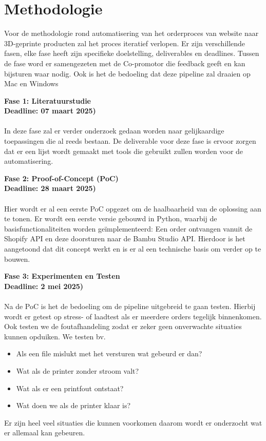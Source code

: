 
\section{Methodologie}%
\label{sec:methodologie}

Voor de methodologie rond automatisering van het orderproces van website naar 3D-geprinte producten zal het proces iteratief verlopen. Er zijn verschillende fasen, elke fase heeft zijn specifieke doelstelling, deliverables en deadlines. Tussen de fase word er samengezeten met de Co-promotor die feedback geeft en kan bijsturen waar nodig. Ook is het de bedoeling dat deze pipeline zal draaien op Mac en Windows 
\vspace{2em}

\textbf{Fase 1: Literatuurstudie}\\
\textbf{Deadline: 07 maart 2025)}\\\\
In deze fase zal er verder onderzoek gedaan worden naar gelijkaardige toepassingen die al reeds bestaan. De deliverable voor deze fase is ervoor zorgen dat er een lijst wordt gemaakt met tools die gebruikt zullen worden voor de automatisering.
\vspace{2em}

\textbf{Fase 2: Proof-of-Concept (PoC)}\\
\textbf{Deadline: 28 maart 2025)}\\\\
Hier wordt er al een eerste PoC opgezet om de haalbaarheid van de oplossing aan te tonen. Er wordt een eerste versie gebouwd in Python, waarbij de basisfunctionaliteiten worden geïmplementeerd: Een order ontvangen vanuit de Shopify API en deze doorsturen naar de Bambu Studio API. Hierdoor is het aangetoond dat dit concept werkt en is er al een technische basis om verder op te bouwen.
\vspace{1em}

\textbf{Fase 3: Experimenten en Testen}\\
\textbf{Deadline: 2 mei 2025)}\\\\
Na de PoC is het de bedoeling om de pipeline uitgebreid te gaan testen. Hierbij wordt er getest op stress- of laadtest als er meerdere orders tegelijk binnenkomen. Ook testen we de foutafhandeling zodat er zeker geen onverwachte situaties kunnen opduiken. We testen bv.
\begin{itemize}
 \item Als een file mislukt met het versturen wat gebeurd er dan?
 \item Wat als de printer zonder stroom valt?
 \item Wat als er een printfout ontstaat?
 \item Wat doen we als de printer klaar is?
\end{itemize}
Er zijn heel veel situaties die kunnen voorkomen daarom wordt er onderzocht wat er allemaal kan gebeuren.
\vspace{1em}

